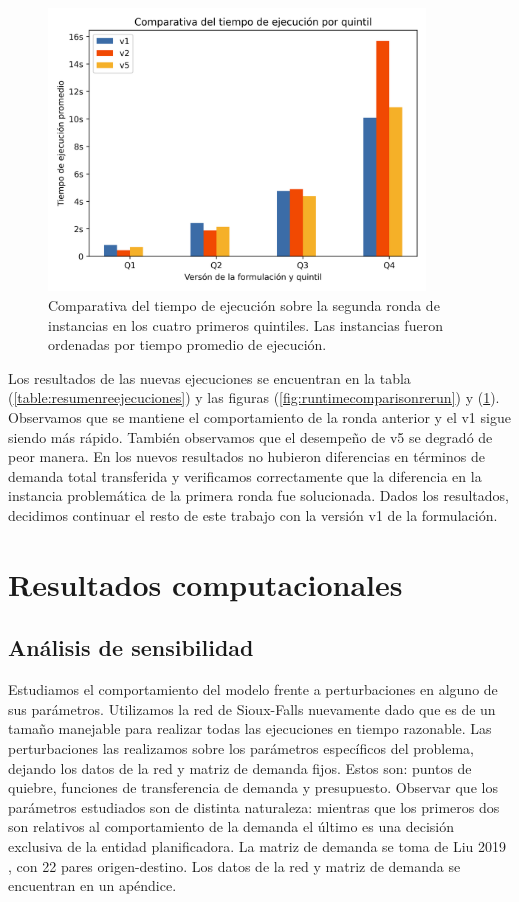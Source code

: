\documentclass{article}
\begin{document}
  \begin{figure}[h!]
    \centering
    \includegraphics[width=10cm]{../resources/run_time_comparsion_by_quintile_rerun.png}
    \caption{Comparativa del tiempo de ejecución sobre la segunda ronda de instancias en los cuatro primeros quintiles. Las instancias fueron ordenadas por tiempo promedio de ejecución.} \label{fig:firstfourquintilesrerun}
  \end{figure}

  Los resultados de las nuevas ejecuciones se encuentran en la tabla (\ref{table:resumenreejecuciones}) y las figuras (\ref{fig:runtimecomparisonrerun}) y (\ref{fig:firstfourquintilesrerun}). Observamos que se mantiene el comportamiento de la ronda anterior y el v1 sigue siendo más rápido. También observamos que el desempeño de v5 se degradó de peor manera. En los nuevos resultados no hubieron diferencias en términos de demanda total transferida y verificamos correctamente que la diferencia en la instancia problemática de la primera ronda fue solucionada. Dados los resultados, decidimos continuar el resto de este trabajo con la versión v1 de la formulación.

  \section{Resultados computacionales}

  \subsection{Análisis de sensibilidad}

  Estudiamos el comportamiento del modelo frente a perturbaciones en alguno de sus parámetros. Utilizamos la red de Sioux-Falls nuevamente dado que es de un tamaño manejable para realizar todas las ejecuciones en tiempo razonable. Las perturbaciones las realizamos sobre los parámetros específicos del problema, dejando los datos de la red y matriz de demanda fijos. Estos son: puntos de quiebre, funciones de transferencia de demanda y presupuesto. Observar que los parámetros estudiados son de distinta naturaleza: mientras que los primeros dos son relativos al comportamiento de la demanda el último es una decisión exclusiva de la entidad planificadora. La matriz de demanda se toma de Liu 2019 \cite{liu2019}, con 22 pares origen-destino. Los datos de la red y matriz de demanda se encuentran en un apéndice.
\end{document}
